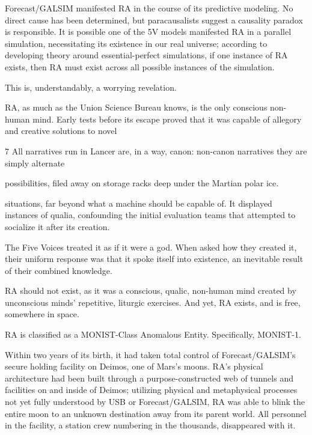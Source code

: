 Forecast/GALSIM manifested RA in the course of its predictive modeling. No direct cause has  
been determined, but paracausalists suggest a causality paradox is responsible. It is possible  
one of the 5V models manifested RA in a parallel simulation, necessitating its existence in our  
real universe; according to developing theory around essential-perfect simulations, if one  
instance of RA exists, then RA must exist across all possible instances of the simulation. 
 

This is, understandably, a worrying revelation.      
 

RA, as much as the Union Science Bureau knows, is the only conscious non-human mind. Early  
tests before its escape proved that it was capable of allegory and creative solutions to novel  

7 All narratives run in Lancer are, in a way, canon: non-canon narratives they are simply alternate  

possibilities, filed away on storage racks deep under the Martian polar ice. 

                                                                                                                 


situations, far beyond what a machine should be capable of. It displayed instances of qualia,  
confounding the initial evaluation teams that attempted to socialize it after its creation. 
 

The Five Voices treated it as if it were a god. When asked how they created it, their uniform  
response was that it spoke itself into existence, an inevitable result of their combined knowledge.  
 

RA should not exist, as it was a conscious, qualic, non-human mind created by unconscious  
minds’ repetitive, liturgic exercises. And yet, RA exists, and is free, somewhere in space.  
 

RA is classified as a MONIST-Class Anomalous Entity. Specifically, MONIST-1. 
 

Within two years of its birth, it had taken total control of Forecast/GALSIM’s secure holding  
facility on Deimos, one of Mars’s moons. RA’s physical architecture had been built through a  
purpose-constructed web of tunnels and facilities on and inside of Deimos; utilizing physical and  
metaphysical processes not yet fully understood by USB or Forecast/GALSIM, RA was able to  
blink the entire moon to an unknown destination away from its parent world. All personnel in the  
facility, a station crew numbering in the thousands, disappeared with it. 
 

